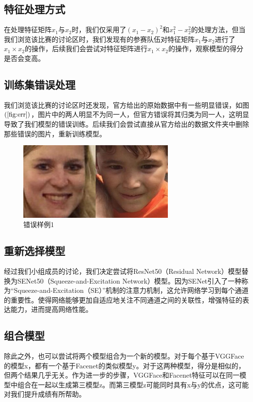 \documentclass[UTF8]{ctexart}
\begin{document}
\subsection{特征处理方式}
在处理特征矩阵$x_1$与$x_2$时，我们仅采用了$(x_1-x_2)^2$和$x_1^2-x_2^2$的处理方法，但当我们浏览该比赛的讨论区时，我们发现有的参赛队伍对特征矩阵$x_1$与$x_2$进行了$x_1\times x_2$的操作，后续我们会尝试对特征矩阵进行$x_1\times x_2$的操作，观察模型的得分是否会变高。
\subsection{训练集错误处理}
我们浏览该比赛的讨论区时还发现，官方给出的原始数据中有一些明显错误，如图$\left(\ref{fig:err}\right)$，图片中的两人明显不为同一人，但官方错误将其归类为同一人，这明显导致了我们模型的错误训练。后续我们会尝试直接从官方给出的数据文件夹中删除那些错误的图片，重新训练模型。
\begin{figure}[!ht]
  \centering
  \includegraphics[width=0.7\textwidth]{err.jpg}
  \caption{错误样例1}
  \label{fig:err}
\end{figure}
\subsection{重新选择模型}
经过我们小组成员的讨论，我们决定尝试将ResNet50（Residual Network）模型替换为SENet50（Squeeze-and-Excitation Network）模型。因为SENet引入了一种称为“Squeeze-and-Excitation（SE）”机制的注意力机制，这允许网络学习到每个通道的重要性。使得网络能够更加自适应地关注不同通道之间的关联性，增强特征的表达能力，进而提高网络性能。
\subsection{组合模型}
除此之外，也可以尝试将两个模型组合为一个新的模型。对于每个基于VGGFace的模型x，都有一个基于Facenet的类似模型y。对于这两种模型，得分是相似的，但两个结果几乎无关。作为进一步的步骤，VGGFace和Facenet特征可以在同一模型中组合在一起以生成第三模型z。而第三模型z可能同时具有x与y的优点，这可能对我们提升成绩有所帮助。
\end{document}

